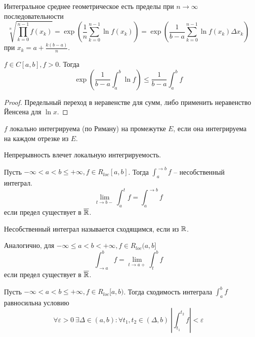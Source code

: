 \begin{Rem}
	Интегральное среднее геометрическое есть пределы при $n \to \infty$ последовательности
	\[\sqrt[n]{\prod_{k = 0}^{n - 1} f(x_k)} = \exp \left(\frac{1}{n} \sum_{k = 0}^{n - 1} \ln f(x_k)\right) = \exp \left(\frac{1}{b - a} \sum_{k = 0}^{n - 1} \ln f(x_k) \Delta x_k\right)\]
	при $x_k = a + \frac{k(b - a)}{n}$.  
\end{Rem}

\begin{Thm}
	$f \in C[a, b], f > 0$. Тогда 
	\[\exp\left(\frac{1}{b - a}\int_a^b \ln f\right) \leqslant \frac{1}{b - a}\int_a^b f\]
\end{Thm}

\begin{proof}
	Предельный переход в неравенстве для сумм, либо применить неравенство Йенсена для $\ln x$.
\end{proof}


\begin{Def}
	$f$ локально интегрируема (по Риману) на промежутке $E$, если она интегрируема на каждом отрезке из $E$.
\end{Def}

\begin{Rem}
	Непрерывность влечет локальную интегрируемость.
\end{Rem}

\begin{Def}
	Пусть $-\infty < a < b \leqslant +\infty, f \in R_{loc}[a, b]$. Тогда
	$\int_a^{\to b}f$ -- несобственный интеграл. 
	\[\lim_{t \to b-} \int_a^t f = \int_a^{\to b} f \]
	если предел существует в $\overline{\mathbb{R}}$. 
\end{Def}

\begin{Def}
	Несобственный интеграл называется сходящимся, если из $\mathbb{R}$. 
\end{Def}

\begin{Def}
	Аналогично, для $-\infty \leqslant a < b < +\infty, f \in R_{loc}(a, b]$ 
	\[\int_{\to a}^b f = \lim_{t \to a+} \int_t^b f\]
	если предел существует в $\overline{\mathbb{R}}$.  
\end{Def}

\begin{Thm}
	Пусть $-\infty < a < b \leqslant +\infty, f \in R_{loc}[a, b)$. Тогда сходимость интеграла $\int_a^b f$ равносильна условию
	\[\forall \varepsilon > 0 \ \exists \Delta \in (a, b) : \forall t_1, t_2 \in (\Delta, b) \ \left|\int_{t_1}^{t_2} f\right| < \varepsilon\]	
\end{Thm}

